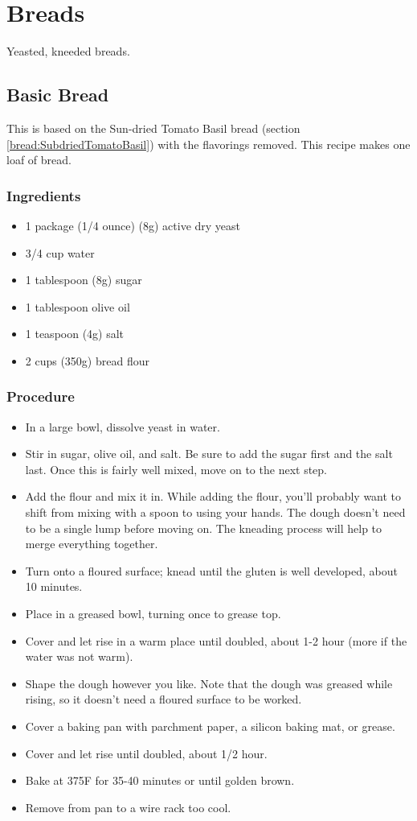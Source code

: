 \documentclass[10pt, openany]{book}
\begin{document}
\chapter{Breads}
Yeasted, kneeded breads.

\section{Basic Bread}
\label{bread:Basic}
This is based on the Sun-dried Tomato Basil bread (section \ref{bread:SubdriedTomatoBasil}) with the flavorings removed.  This recipe makes one loaf of bread.

\subsection{Ingredients}
\begin{itemize}
  \item 1 package (1/4 ounce) (8g) active dry yeast
  \item 3/4 cup water
  \item 1 tablespoon (8g) sugar
  \item 1 tablespoon olive oil
  \item 1 teaspoon (4g) salt
  \item 2 cups (350g) bread flour
\end{itemize}
\subsection{Procedure}
\begin{itemize}
  \item In a large bowl, dissolve yeast in water.
  \item Stir in sugar, olive oil, and salt.  Be sure to add the sugar first and the salt last.  Once this is fairly well mixed, move on to the next step.
  \item Add the flour and mix it in.  While adding the flour, you'll probably want to shift from mixing with a spoon to using your hands.  The dough doesn't need to be a single lump before moving on.  The kneading process will help to merge everything together.
  \item Turn onto a floured surface; knead until the gluten is well developed, about 10 minutes.
  \item Place in a greased bowl, turning once to grease top.
  \item Cover and let rise in a warm place until doubled, about 1-2 hour (more if the water was not warm).
  \item Shape the dough however you like.  Note that the dough was greased while rising, so it doesn't need a floured surface to be worked.
  \item Cover a baking pan with parchment paper, a silicon baking mat, or grease.
  \item Cover and let rise until doubled, about 1/2 hour.
  \item Bake at 375\degree{}F for 35-40 minutes or until golden brown.
  \item Remove from pan to a wire rack too cool.
\end{itemize}
\end{document}
